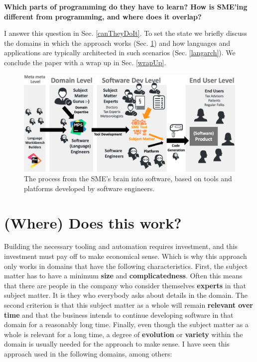 \documentclass[runningheads]{llncs}
\newcommand{\sect}[1]{Sec. \ref{#1}}  %
\newcommand\todo[1]{}
\begin{document}
\vspace{2mm}
\noindent \textbf{Which parts of programming do they have to learn?
How is SME'ing different from programming, and where does it overlap?}
\vspace{2mm}

\noindent I answer this question in \sect{canTheyDoIt}. To set the state we
briefly discuss the domains in which the approach works (\sect{where}) and how
languages and applications are typically architected in such scenarios
(\sect{langarch}).
We conclude the paper with a wrap up in \sect{wrapUp}.

\begin{figure}
\begin{center}
    \includegraphics[width=1\columnwidth]{figures/bigpic.png}
    \caption{The process from the SME's brain into software, based on
    tools and platforms developed by software engineers.}
    \label{bigpic}
\end{center} 
\end{figure} 

\todo{Refer to Manifesto when it is done}

\section{(Where) Does this work?}
\label{where}

Building the necessary tooling and automation requires investment, and this
investment must pay off to make economical sense. Which is why this
approach only works in domains that have the following characteristics. First,
the subject matter has to have a minimum
\textbf{size} and \textbf{complicatedness}. Often this means that there are
people in the company who consider themselves \textbf{experts} in that
subject matter. It is they who everybody asks about details in the domain.
The second criterion is that this subject matter as a whole will remain
\textbf{relevant over time} and that the business intends to continue developing
software in that domain for a reasonably long time. Finally, even though the
subject matter as a whole is relevant for a long time, a degree of
\textbf{evolution} or \textbf{variety} within the domain is usually needed for
the approach to make sense. I have seen this approach used in the following
domains, among others:
\end{document}
